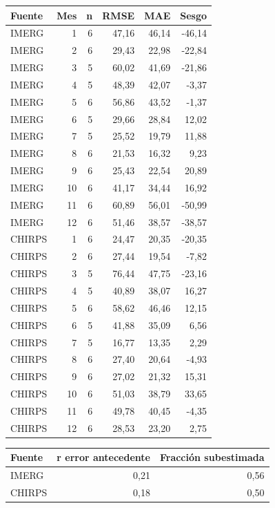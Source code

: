 \documentclass[10pt,a4paper]{article}
\begin{document}
\begin{center}\small\begin{tabular}{lrrrrr}\hline
Fuente & Mes & n & RMSE & MAE & Sesgo \\ \hline
IMERG & 1 & 6 & 47,16 & 46,14 & -46,14 \\
IMERG & 2 & 6 & 29,43 & 22,98 & -22,84 \\
IMERG & 3 & 5 & 60,02 & 41,69 & -21,86 \\
IMERG & 4 & 5 & 48,39 & 42,07 & -3,37 \\
IMERG & 5 & 6 & 56,86 & 43,52 & -1,37 \\
IMERG & 6 & 5 & 29,66 & 28,84 & 12,02 \\
IMERG & 7 & 5 & 25,52 & 19,79 & 11,88 \\
IMERG & 8 & 6 & 21,53 & 16,32 & 9,23 \\
IMERG & 9 & 6 & 25,43 & 22,54 & 20,89 \\
IMERG & 10 & 6 & 41,17 & 34,44 & 16,92 \\
IMERG & 11 & 6 & 60,89 & 56,01 & -50,99 \\
IMERG & 12 & 6 & 51,46 & 38,57 & -38,57 \\
CHIRPS & 1 & 6 & 24,47 & 20,35 & -20,35 \\
CHIRPS & 2 & 6 & 27,44 & 19,54 & -7,82 \\
CHIRPS & 3 & 5 & 76,44 & 47,75 & -23,16 \\
CHIRPS & 4 & 5 & 40,89 & 38,07 & 16,27 \\
CHIRPS & 5 & 6 & 58,62 & 46,46 & 12,15 \\
CHIRPS & 6 & 5 & 41,88 & 35,09 & 6,56 \\
CHIRPS & 7 & 5 & 16,77 & 13,35 & 2,29 \\
CHIRPS & 8 & 6 & 27,40 & 20,64 & -4,93 \\
CHIRPS & 9 & 6 & 27,02 & 21,32 & 15,31 \\
CHIRPS & 10 & 6 & 51,03 & 38,79 & 33,65 \\
CHIRPS & 11 & 6 & 49,78 & 40,45 & -4,35 \\
CHIRPS & 12 & 6 & 28,53 & 23,20 & 2,75 \\
\hline\end{tabular}\end{center}
\begin{center}\small\begin{tabular}{lrr}\hline
Fuente & r error antecedente & Fracción subestimada \\ \hline
IMERG & 0,21 & 0,56 \\
CHIRPS & 0,18 & 0,50 \\
\hline\end{tabular}\end{center}
\end{document}
